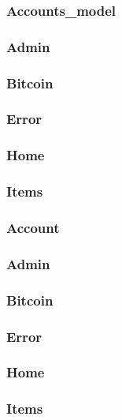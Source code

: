 \documentclass[11pt]{article} %
\begin{document}
\subsubsection{Accounts\_model}
\subsubsection{Admin}
\subsubsection{Bitcoin}
\subsubsection{Error}
\subsubsection{Home}
\subsubsection{Items}
\subsubsection{Account}
\subsubsection{Admin}
\subsubsection{Bitcoin}
\subsubsection{Error}
\subsubsection{Home}
\subsubsection{Items}
\end{document}
